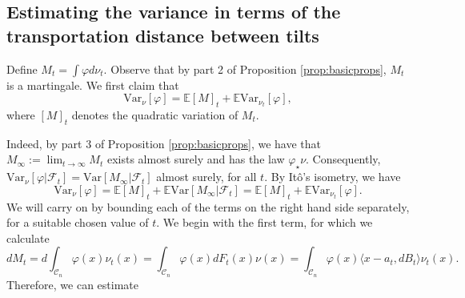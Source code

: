 \documentclass[12pt]{article}
\def \EE {\mathbb E}
\def \Var {\mathrm{Var}}
\def \DC {\mathcal{C}_n}
\def \FF {\mathcal{F}}
\theoremstyle{definition}
\theoremstyle{remark}
\begin{document}
\subsection{Estimating the variance in terms of the transportation distance between tilts}
Define $M_t = \int \varphi d \nu_t$. Observe that by part 2 of Proposition \ref{prop:basicprops}, $M_t$ is a martingale. We first claim that
\begin{equation}\label{eq:totalvar}
\Var_\nu[\varphi] = \EE [M]_t + \EE \Var_{\nu_t}[\varphi],
\end{equation}
where $[M]_t$ denotes the quadratic variation of $M_t$.

Indeed, by part 3 of Proposition \ref{prop:basicprops}, we have that $M_\infty := \lim_{t \to \infty} M_t$ exists almost surely and has the law $\varphi_\star \nu$. Consequently, $\Var_\nu[\varphi | \FF_t] = \Var[M_\infty | \FF_t]$ almost surely, for all $t$. By It\^o's isometry, we have
$$
\Var_\nu[\varphi] = \EE [M]_t + \EE \Var[M_\infty | \FF_t] = \EE [M]_t + \EE \Var_{\nu_t}[\varphi].
$$
We will carry on by bounding each of the terms on the right hand side separately, for a suitable chosen value of $t$. We begin with the first term, for which we calculate
$$
d M_t = d \int_{\DC} \varphi(x) \nu_t(x) = \int_{\DC} \varphi(x) d F_t(x) \nu(x) = \int_{\DC} \varphi(x) \langle x-a_t, d B_t \rangle \nu_t(x).
$$
Therefore, we can estimate
\end{document}
